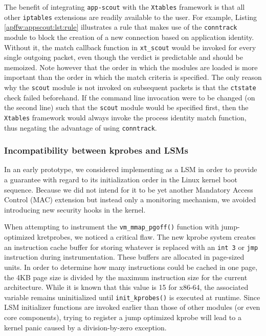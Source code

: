 The benefit of integrating \texttt{app-scout} with the \texttt{Xtables}
framework is that all other \texttt{iptables} extensions are readily available
to the user. For example, Listing \ref{apffw:appscout:lst:rule} illustrates a
rule that makes use of the \texttt{conntrack} module to block the creation of a
new connection based on application identity. Without it, the match callback
function in \texttt{xt\_scout} would be invoked for every single outgoing
packet, even though the verdict is predictable and should be memoized. Note
however that the order in which the modules are loaded is more important than
the order in which the match criteria is specified. The only reason why the
\texttt{scout} module is not invoked on subsequent packets is that the
\texttt{ctstate} check failed beforehand. If the command line invocation were to
be changed (on the second line) such that the \texttt{scout} module would be
specified first, then the \texttt{Xtables} framework would always invoke the
process identity match function, thus negating the advantage of using
\texttt{conntrack}.


\subsubsection{Incompatibility between kprobes and LSMs}
\label{appfw:appscout:incompatibility}

In an early prototype, we considered implementing \scout{} as a LSM in order to
provide a guarantee with regard to its initialization order in the Linux kernel
boot sequence. Because we did not intend for it to be yet another Mandatory
Access Control (MAC) extension but instead only a monitoring mechanism, we
avoided introducing new security hooks in the kernel.

When attempting to instrument the \texttt{vm\_mmap\_pgoff()} function with
jump-optimized kretprobes, we noticed a critical flaw. The new kprobe system
creates an instruction cache buffer for storing whatever is replaced with an
\texttt{int 3} or \texttt{jmp} instruction during instrumentation. These buffers
are allocated in page-sized units. In order to determine how many instructions
could be cached in one page, the 4KB page size is divided by the maximum
instruction size for the current architecture. While it is known that this value
is 15 for x86-64, the associated variable remains uninitialized until
\texttt{init\_kprobes()} is executed at runtime. Since LSM initializer functions
are invoked earlier than those of other modules (or even core components),
trying to register a jump optimized kprobe will lead to a kernel panic caused
by a division-by-zero exception.

